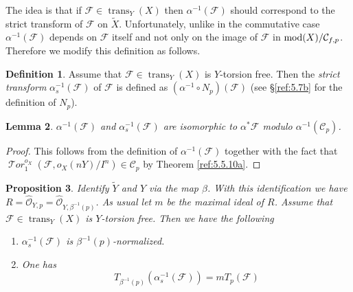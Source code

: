 \documentclass{amsproc}
\def\Cscr{{\mathcal C}}
\def\Fscr{{\mathcal F}}
\def\Oscr{{\mathcal O}}
\def\Tscr{{\mathcal T}}
\def\HTor{\operatorname {\Tscr \mathit{or}}}
\def\mod{\mathop{\text{mod}}}
\def\trans{\operatorname{trans}}
\def\HTor{\operatorname {\Tscr \mathit{or}}}
\let\oldtext\text
\def\text#1{\oldtext{\upshape #1}}
\newtheorem{lemmas}{Lemma}[subsection]
\newtheorem{propositions}[lemmas]{Proposition}
\theoremstyle{definition}
\newtheorem{definitions}[lemmas]{Definition}
\theoremstyle{remark}
\numberwithin{equation}{section}
\numberwithin{table}{section}
\numberwithin{figure}{section}
\begin{document}
The idea is that if $\Fscr\in \trans_Y(X)$ then $\alpha^{-1}(\Fscr)$
should correspond to the strict transform of $\Fscr$ on $\tilde{X}$.
Unfortunately, unlike in the commutative case $\alpha^{-1}(\Fscr)$
depends on $\Fscr$ itself and not only on  the image of  $\Fscr$
in $\mod(X)/\Cscr_{f,p}$. Therefore we modify this definition as follows.
\begin{definitions}
  Assume that $\Fscr\in \trans_Y(X)$ is $Y$-torsion free. Then the
  \emph{strict transform} $\alpha_s^{-1}(\Fscr)$ of $\Fscr$ is defined
  as $(\alpha^{-1}\circ N_p)(\Fscr)$ (see \S\ref{ref:5.7b} for the
  definition of $N_p$).
\end{definitions}
\begin{lemmas} 
\label{ref:6.8.4a}
$\alpha^{-1}(\Fscr)$ and $\alpha^{-1}_s(\Fscr)$ are
  isomorphic to $\alpha^\ast\Fscr$ modulo $\alpha^{-1}(\Cscr_p)$.
\end{lemmas}
\begin{proof} This follows from the definition of $\alpha^{-1}(\Fscr)$
  together with the fact that
  $\HTor_1^{o_X}(\Fscr,o_X(nY) /I^n)\in\Cscr_p$ by Theorem
  \ref{ref:5.5.10a}. 
\end{proof}
\begin{propositions}
\label{ref:6.8.5a}
Identify $\tilde{Y}$ and $Y$ via the map $\beta$.  With this
identification we have
$R=\hat{\Oscr}_{Y,p}=\hat{\Oscr}_{Y,\beta^{-1}(p)}$.  As usual let $m$
be the maximal ideal of $R$. Assume that $\Fscr\in\trans_Y(X)$ is
$Y$-torsion free.  Then we have the following
\begin{enumerate} 
\item $\alpha_s^{-1}(\Fscr)$ is $\beta^{-1}(p)$-normalized.
\item One has
\begin{equation}
\label{ref:6.44a}
T_{\beta^{-1}(p)}(\alpha^{-1}_s(\Fscr))=mT_p(\Fscr)
\end{equation}
\end{enumerate}
\end{propositions}
\end{document}
